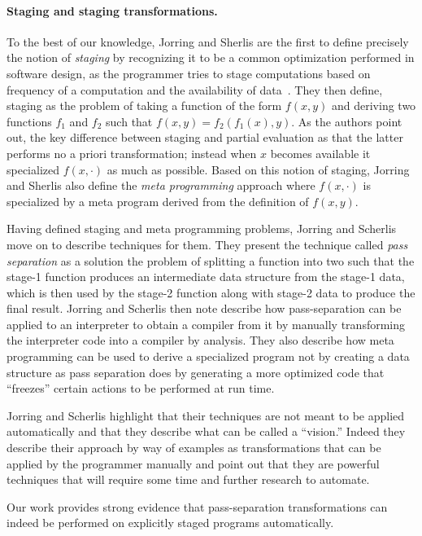 \paragraph{Staging and staging transformations.}

To the best of our knowledge, Jorring and Sherlis are the
first to define precisely the notion of {\em staging} by recognizing
it to be a common optimization performed in software design, as the
programmer tries to stage computations based on frequency of a
computation and the availability of data~\cite{jorring86}.  They then
define, staging as the problem of taking a function of the form
$f(x,y)$ and deriving two functions $f_1$ and $f_2$ such that $f(x,y)
= f_2(f_1(x),y)$.  As the authors point out, the key difference
between staging and partial evaluation as that the latter performs no
a priori transformation; instead when $x$ becomes available it
specialized $f(x,\cdot)$ as much as possible.  Based on this notion of
staging, Jorring and Sherlis also define the {\em meta programming}
approach where $f(x, \cdot)$ is specialized by a meta program derived
from the definition of $f(x,y)$.

Having defined staging and meta programming problems, Jorring and
Scherlis move on to describe techniques for them.  They present the
technique called {\em pass separation} as a solution the problem of
splitting a function into two such that the stage-1 function produces
an intermediate data structure from the stage-1 data, which is then
used by the stage-2 function along with stage-2 data to produce the
final result.  Jorring and Scherlis then note describe how
pass-separation can be applied to an interpreter to obtain a compiler
from it by manually transforming the interpreter code into a compiler
by analysis. They also describe how meta programming can be used to
derive a specialized program not by creating a data structure as pass
separation does by generating a more optimized code that ``freezes''
certain actions to be performed at run time. 

Jorring and Scherlis highlight that their techniques are not meant to
be applied automatically and that they describe what can be called a
``vision.''  Indeed they describe their approach by way of examples as
transformations that can be applied by the programmer manually and
point out that they are powerful techniques that will require some time
and further research to automate.

Our work provides strong evidence that pass-separation transformations
can indeed be performed on explicitly staged programs automatically.

